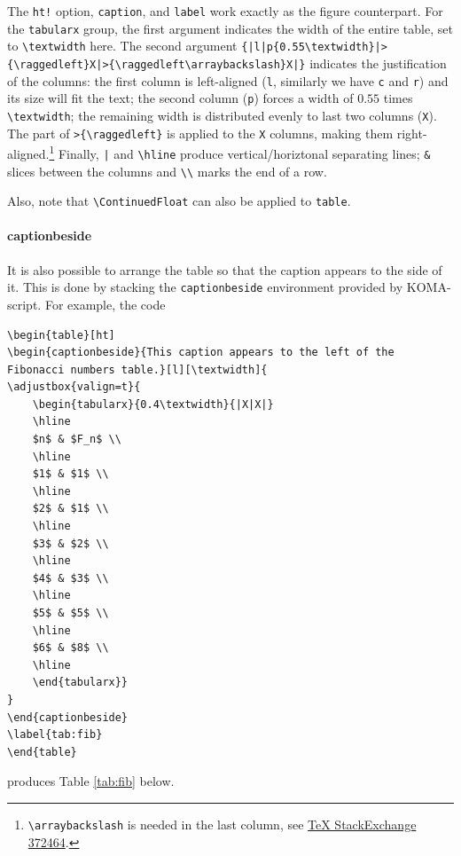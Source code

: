 The \verb|ht!| option, \verb|caption|, and \verb|label| work exactly as the figure counterpart. For the \verb|tabularx| group, the first argument indicates the width of the entire table, set to \texttt{\textbackslash textwidth} here. The second argument \texttt{\{|l|p\{0.55\textbackslash textwidth\}|\allowbreak >\{\textbackslash raggedleft\}X|>\{\textbackslash raggedleft\textbackslash arraybackslash\}X|\}} indicates the justification of the columns: the first column is left-aligned (\verb|l|, similarly we have \verb|c| and \verb|r|) and its size will fit the text; the second column (\verb|p|) forces a width of $0.55$ times \texttt{\textbackslash textwidth}; the remaining width is distributed evenly to last two columns (\verb|X|). The part of \texttt{>\{\textbackslash raggedleft\}} is applied to the \verb|X| columns, making them right-aligned.\footnote{\texttt{\textbackslash arraybackslash} is needed in the last column, see \href{https://tex.stackexchange.com/questions/372464/last-tabularx-column-raggedright-with-memoir}{\TeX{} StackExchange 372464}.} Finally, \texttt{|} and \texttt{\textbackslash hline} produce vertical/horiztonal separating lines; \texttt{\&} slices between the columns and \texttt{\textbackslash\textbackslash} marks the end of a row.

Also, note that \texttt{\textbackslash ContinuedFloat} can also be applied to \texttt{table}.

\paragraph{captionbeside} It is also possible to arrange the table so that the caption appears to the side of it. This is done by stacking the \verb|captionbeside| environment provided by KOMA-script. For example, the code
\begin{lstlisting}
\begin{table}[ht]
\begin{captionbeside}{This caption appears to the left of the Fibonacci numbers table.}[l][\textwidth]{
\adjustbox{valign=t}{
    \begin{tabularx}{0.4\textwidth}{|X|X|}
    \hline
    $n$ & $F_n$ \\
    \hline 
    $1$ & $1$ \\
    \hline 
    $2$ & $1$ \\
    \hline 
    $3$ & $2$ \\
    \hline 
    $4$ & $3$ \\
    \hline
    $5$ & $5$ \\
    \hline
    $6$ & $8$ \\
    \hline
    \end{tabularx}}
}
\end{captionbeside}
\label{tab:fib}
\end{table}    
\end{lstlisting}
produces Table \ref{tab:fib} below.

